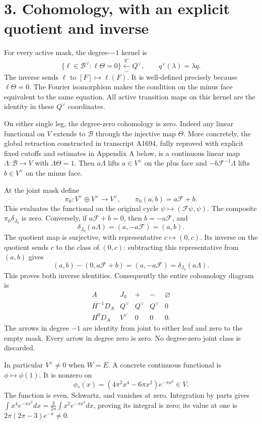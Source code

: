 \documentclass[
  11pt,
]{article}
\begin{document}
\section{3. Cohomology, with an explicit quotient and
inverse}\label{cohomology-with-an-explicit-quotient-and-inverse}

For every active mask, the degree-\(-1\) kernel is \[
\{\ell\in\mathscr B^\vee:\ell\Theta=0\}
\xleftarrow[\sim]{q^\vee}Q^\vee,
\qquad q^\vee(\lambda)=\lambda q.
\] The inverse sends \(\ell\) to \([F]\mapsto\ell(F)\). It is
well-defined precisely because \(\ell\Theta=0\). The Fourier isomorphism
makes the condition on the minus face equivalent to the same equation.
All active transition maps on this kernel are the identity in these
\(Q^\vee\) coordinates.

On either single leg, the degree-zero cohomology is zero. Indeed any
linear functional on \(V\) extends to \(\mathscr B\) through the
injective map \(\Theta\). More concretely, the global retraction
constructed in transcript A1694, fully reproved with explicit fixed
cutoffs and estimates in Appendix A below, is a continuous linear map
\(\Lambda:\mathscr B\to V\) with \(\Lambda\Theta=1\). Then \(a\Lambda\)
lifts \(a\in V^\vee\) on the plus face and \(-b\mathcal F^{-1}\Lambda\)
lifts \(b\in V^\vee\) on the minus face.

At the joint mask define \[
\pi_0:V^\vee\oplus V^\vee\longrightarrow V^\vee,
\qquad\pi_0(a,b)=a\mathcal F+b.
\] This evaluates the functional on the original cycle
\(\psi\mapsto(\mathcal F\psi,\psi)\). The composite
\(\pi_0\delta_{J_0}\) is zero. Conversely, if \(a\mathcal F+b=0\), then
\(b=-a\mathcal F\), and \[
\delta_{J_0}(a\Lambda)=(a,-a\mathcal F)=(a,b).
\] The quotient map is surjective, with representative
\(c\mapsto(0,c)\). Its inverse on the quotient sends \(c\) to the class
of \((0,c)\): subtracting this representative from \((a,b)\) gives \[
(a,b)-(0,a\mathcal F+b)=(a,-a\mathcal F)=\delta_{J_0}(a\Lambda).
\] This proves both inverse identities. Consequently the entire
cohomology diagram is \[
\begin{array}{c|cccc}
A&J_0&+&-&\varnothing\\ \hline
H^{-1}D_A&Q^\vee&Q^\vee&Q^\vee&0\\
H^0D_A&V^\vee&0&0&0.
\end{array}
\] The arrows in degree \(-1\) are identity from joint to either leaf
and zero to the empty mask. Every arrow in degree zero is zero. No
degree-zero joint class is discarded.

In particular \(V^\vee\ne0\) when \(W=E\). A concrete continuous
functional is \(\phi\mapsto\phi(1)\). It is nonzero on \[
\phi_*(x)=(4\pi^2x^4-6\pi x^2)e^{-\pi x^2}\in V.
\] The function is even, Schwartz, and vanishes at zero. Integration by
parts gives
\(\int x^4e^{-\pi x^2}dx=\frac{3}{2\pi}\int x^2e^{-\pi x^2}dx\), proving
its integral is zero; its value at one is \(2\pi(2\pi-3)e^{-\pi}\ne0\).
\end{document}
